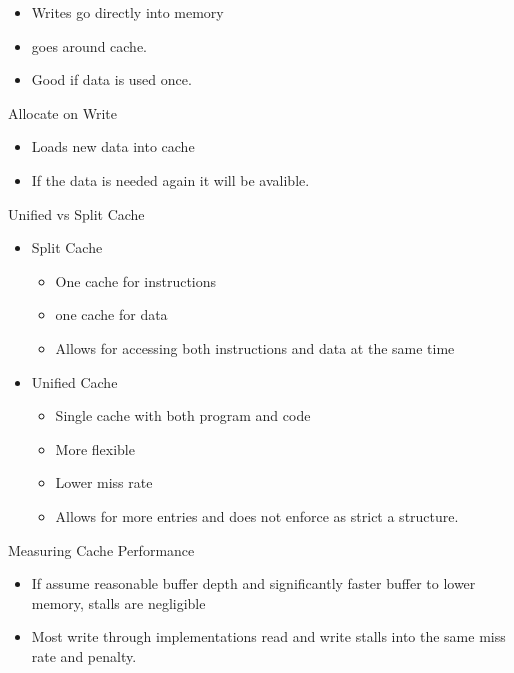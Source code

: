 \documentclass{report}
\begin{document}
\begin{description}
\begin{itemize}
            \item Writes go directly into memory
            \item goes around cache.
            \item Good if data is used once.
        \end{itemize}
    \item {\large Allocate on Write}
        \begin{itemize}
            \item Loads new data into cache
            \item If the data is needed again it will be
                avalible.
        \end{itemize}
    \item {\large Unified vs Split Cache}
        \begin{itemize}
            \item Split Cache
                \begin{itemize}
                    \item One cache for instructions
                    \item one cache for data
                    \item Allows for accessing both instructions
                        and data at the same time
                \end{itemize}
            \item Unified Cache
                \begin{itemize}
                    \item Single cache with both program and code
                    \item More flexible
                    \item Lower miss rate
                    \item Allows for more entries and does not
                        enforce as strict a structure.
                \end{itemize}
        \end{itemize}
    \item {\large Measuring Cache Performance}
        \begin{itemize}
            \item If assume reasonable buffer depth and significantly
                faster buffer to lower memory, stalls are negligible
            \item Most write through implementations read and write
                stalls into the same miss rate and penalty.

\end{itemize}
\end{description}
\end{document}
